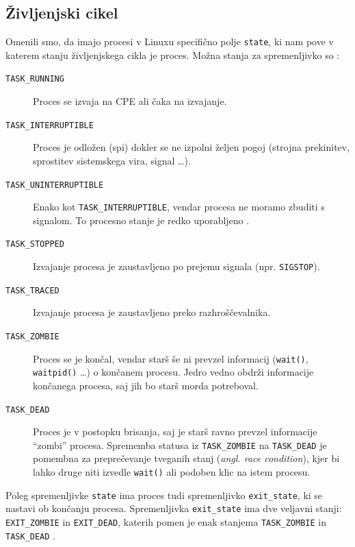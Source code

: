 \documentclass[a4paper,12pt,openright]{book}
\begin{document}
\subsection{Življenjski cikel} \label{ssec:linux_process:lifecycle} %

Omenili smo, da imajo procesi v Linuxu specifično polje \texttt{state}, ki nam pove v katerem stanju življenjskega cikla je proces.
Možna stanja za spremenljivko so \cite{Bovet_Cesati_2005}:
\begin{description}
	\item[\texttt{TASK\_RUNNING}] Proces se izvaja na CPE ali čaka na izvajanje.
	\item[\texttt{TASK\_INTERRUPTIBLE}] Proces je odložen (spi) dokler se ne izpolni željen pogoj (strojna prekinitev, sprostitev sistemskega vira, signal \dots).
	\item[\texttt{TASK\_UNINTERRUPTIBLE}] Enako kot \texttt{TASK\_INTERRUPTIBLE}, vendar procesa ne moramo zbuditi s signalom.
	To procesno stanje je redko uporabljeno \cite{Bovet_Cesati_2005}.
	\item[\texttt{TASK\_STOPPED}] Izvajanje procesa je zaustavljeno po prejemu signala (npr. \texttt{SIGSTOP}).
	\item[\texttt{TASK\_TRACED}] Izvajanje procesa je zaustavljeno preko razhroščevalnika.
	\item[\texttt{TASK\_ZOMBIE}] Proces se je končal, vendar starš še ni prevzel informacij (\texttt{wait()}, \texttt{waitpid()} \dots) o končanem procesu.
	Jedro vedno obdrži informacije končanega procesa, saj jih bo starš morda potreboval.
	\item[\texttt{TASK\_DEAD}] Proces je v postopku brisanja, saj je starš ravno prevzel informacije ``zombi'' procesa.
	Sprememba statusa iz \texttt{TASK\_ZOMBIE} na \texttt{TASK\_DEAD} je pomembna za preprečevanje tveganih stanj (\textit{angl. race condition}), kjer bi lahko druge niti izvedle \texttt{wait()} ali podoben klic na istem procesu.
\end{description}

Poleg spremenljivke \texttt{state} ima proces tudi spremenljivko \texttt{exit\_state}, ki se nastavi ob končanju procesa.
Spremenljivka \texttt{exit\_state} ima dve veljavni stanji: \texttt{EXIT\_ZOMBIE} in \texttt{EXIT\_DEAD}, katerih pomen je enak stanjema \texttt{TASK\_ZOMBIE} in \texttt{TASK\_DEAD} \cite{Bovet_Cesati_2005}.
\end{document}
